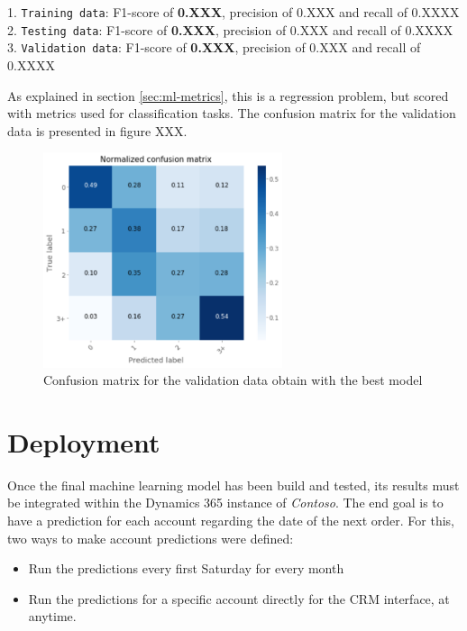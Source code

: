 \noindent\hspace*{0.8cm}  1. \texttt{Training data}:   F1-score of \textbf{0.XXX}, precision of 0.XXX and recall of 0.XXXX \\
\hspace*{0.8cm}           2. \texttt{Testing data}:    F1-score of \textbf{0.XXX}, precision of 0.XXX and recall of 0.XXXX \\
\hspace*{0.8cm}           3. \texttt{Validation data}: F1-score of \textbf{0.XXX}, precision of 0.XXX and recall of 0.XXXX

As explained in section \ref{sec:ml-metrics}, this is a regression problem, but scored with metrics used for classification tasks. The confusion matrix for the validation data is presented in figure XXX.

\begin{figure}[!h]
    \centering
    \includegraphics[width=7cm]{images/cf-matrix-validation.png}
    \caption[Confusion matrix for validation data]{Confusion matrix for the validation data obtain with the best model}
    \label{fig:lst-data-build}
\end{figure}


\section{Deployment} \label{sec:crm-deployment}
Once the final machine learning model has been build and tested, its results must be integrated within the Dynamics 365 instance of \textit{Contoso}. The end goal is to have a prediction for each account regarding the date of the next order. For this, two ways to make account predictions were defined:
\begin{itemize}
    \item Run the predictions every first Saturday for every month
    \item Run the predictions for a specific account directly for the CRM interface, at anytime.
\end{itemize}


